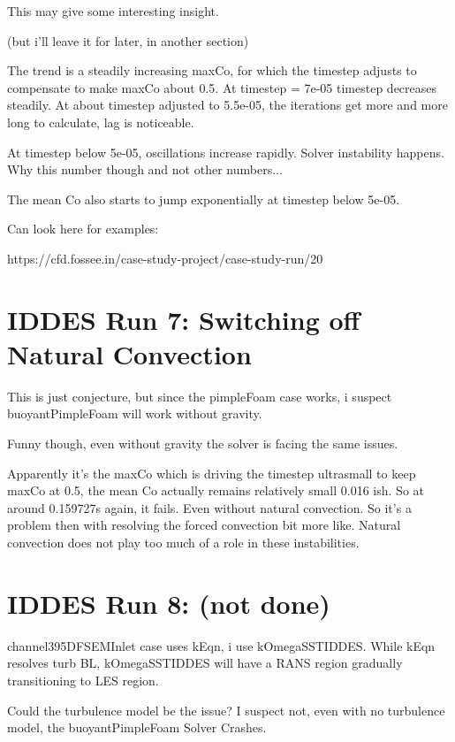 \documentclass[12pt]{article}
\renewcommand{\_}{\kern-1.5pt\textunderscore\kern-1.5pt}
\begin{document}
This may give some interesting insight.

(but i'll leave it for later, in another section)

The trend is a steadily increasing maxCo, for which the timestep adjusts
to compensate to make maxCo about 0.5. At timestep = 7e-05 timestep
decreases steadily. At about timestep adjusted to 5.5e-05, the iterations
get more and more long to calculate, lag is noticeable. 

At timestep below 5e-05, oscillations increase rapidly. Solver instability
happens. Why this number though and not other numbers...

The mean Co also starts to jump exponentially at timestep below 5e-05. 

Can look here for examples:

https://cfd.fossee.in/case-study-project/case-study-run/20

\section{IDDES Run 7: Switching off Natural Convection}

This is just conjecture, but since the pimpleFoam case works, i suspect
buoyantPimpleFoam will work without gravity.



Funny though, even without gravity the solver is facing the same issues.



Apparently it's the maxCo which is driving the timestep ultrasmall
to keep maxCo at 0.5, the mean Co actually remains relatively small
0.016 ish. So at around 0.159727s again, it fails. Even without natural
convection. So it's a problem then with resolving the forced convection
bit more like. Natural convection does not play too much of a role
in these instabilities. 



\section{IDDES Run 8: (not done)}



channel395DFSEMInlet case uses kEqn, i use kOmegaSSTIDDES. While kEqn
resolves turb BL, kOmegaSSTIDDES will have a RANS region gradually
transitioning to LES region.



Could the turbulence model be the issue? I suspect not, even with no turbulence model, the buoyantPimpleFoam Solver Crashes.
\end{document}

